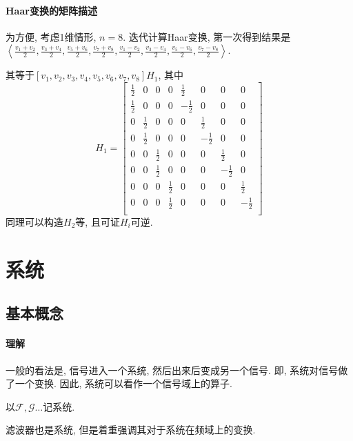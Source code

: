 \documentclass{ctexart}
\begin{document}
\paragraph{Haar变换的矩阵描述} 为方便, 考虑1维情形, $n=8$.
    迭代计算Haar变换, 第一次得到结果是
    $\left\langle \frac{v_1+v_2}{2}, \frac{v_3+v_4}{2}, \frac{v_5+v_6}{2}, \frac{v_7+v_8}{2},
        \frac{v_1-v_2}{2}, \frac{v_3-v_4}{2}, \frac{v_5-v_6}{2}, \frac{v_7-v_8}{2}\right\rangle$.\par
    其等于$\left[ v_1, v_2, v_3, v_4, v_5, v_6, v_7, v_8\right] H_1$, 其中
    \[
        H_1 = \begin{bmatrix}
        \frac{1}{2} & 0           & 0           & 0           & \frac{1}{2}  & 0            & 0            & 0            \\
        \frac{1}{2} & 0           & 0           & 0           & -\frac{1}{2} & 0            & 0            & 0            \\
                  0 & \frac{1}{2} & 0           & 0           & 0            & \frac{1}{2}  & 0            & 0            \\
                  0 & \frac{1}{2} & 0           & 0           & 0            & -\frac{1}{2} & 0            & 0            \\
                  0 & 0           & \frac{1}{2} & 0           & 0            & 0            & \frac{1}{2}  & 0            \\
                  0 & 0           & \frac{1}{2} & 0           & 0            & 0            & -\frac{1}{2} & 0            \\
                  0 & 0           & 0           & \frac{1}{2} & 0            & 0            & 0            & \frac{1}{2}  \\
                  0 & 0           & 0           & \frac{1}{2} & 0            & 0            & 0            & -\frac{1}{2} \\
        \end{bmatrix}
    \]同理可以构造$H_2$等, 且可证$H_i$可逆.

\section{系统}
\subsection{基本概念}
\paragraph{理解}
    一般的看法是, 信号进入一个系统, 然后出来后变成另一个信号. 即, 系统对信号做了一个变换.
    因此, 系统可以看作一个信号域上的算子.\par
    以$\mathcal{F}, \mathcal{G}\ldots$记系统.\par
    滤波器也是系统, 但是着重强调其对于系统在频域上的变换.
\end{document}
